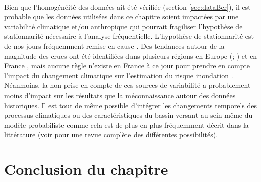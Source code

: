\documentclass[11pt]{article}
\begin{document}
	\paragraph{} Bien que l'homogénéité des données ait été vérifiée (section \ref{sec:dataBcr}), il est probable que les données utilisées dans ce chapitre soient impactées par une variabilité climatique et/ou anthropique qui pourrait fragiliser l'hypothèse de stationnarité nécessaire à l'analyse fréquentielle. L'hypothèse de stationnarité est de nos jours fréquemment remise en cause \citep{milly_stationarity_2008}. Des tendances autour de la magnitude des crues ont été identifiées dans plusieurs régions en Europe (\citet{hall_understanding_2014}; \citet{bloschl_changing_2019}) et en France \citet{giuntoli_floods_2019}, mais aucune règle n'existe en France à ce jour pour prendre en compte l'impact du changement climatique sur l'estimation du risque inondation \citet{madsen_review_2014}. Néanmoins, la non-prise en compte de ces sources de variabilité a probablement moins d'impact sur les résultats que la méconnaissance autour des données historiques. Il est tout de même possible d'intégrer les changements temporels des processus climatiques ou des caractéristiques du bassin versant au sein même du modèle probabiliste comme cela est de plus en plus fréquemment décrit dans la littérature (voir \citet{salas_techniques_2018} pour une revue complète des différentes possibilités). 

	
\section{Conclusion du chapitre}
\label{sec:Conclu}
\end{document}
